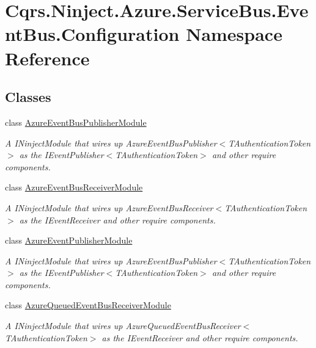 \hypertarget{namespaceCqrs_1_1Ninject_1_1Azure_1_1ServiceBus_1_1EventBus_1_1Configuration}{}\section{Cqrs.\+Ninject.\+Azure.\+Service\+Bus.\+Event\+Bus.\+Configuration Namespace Reference}
\label{namespaceCqrs_1_1Ninject_1_1Azure_1_1ServiceBus_1_1EventBus_1_1Configuration}
\subsection*{Classes}
\begin{DoxyCompactItemize}
\item 
class \hyperlink{classCqrs_1_1Ninject_1_1Azure_1_1ServiceBus_1_1EventBus_1_1Configuration_1_1AzureEventBusPublisherModule}{Azure\+Event\+Bus\+Publisher\+Module}
\begin{DoxyCompactList}\small\item\em A I\+Ninject\+Module that wires up Azure\+Event\+Bus\+Publisher$<$\+T\+Authentication\+Token$>$ as the I\+Event\+Publisher$<$\+T\+Authentication\+Token$>$ and other require components. \end{DoxyCompactList}\item 
class \hyperlink{classCqrs_1_1Ninject_1_1Azure_1_1ServiceBus_1_1EventBus_1_1Configuration_1_1AzureEventBusReceiverModule}{Azure\+Event\+Bus\+Receiver\+Module}
\begin{DoxyCompactList}\small\item\em A I\+Ninject\+Module that wires up Azure\+Event\+Bus\+Receiver$<$\+T\+Authentication\+Token$>$ as the I\+Event\+Receiver and other require components. \end{DoxyCompactList}\item 
class \hyperlink{classCqrs_1_1Ninject_1_1Azure_1_1ServiceBus_1_1EventBus_1_1Configuration_1_1AzureEventPublisherModule}{Azure\+Event\+Publisher\+Module}
\begin{DoxyCompactList}\small\item\em A I\+Ninject\+Module that wires up Azure\+Event\+Bus\+Publisher$<$\+T\+Authentication\+Token$>$ as the I\+Event\+Publisher$<$\+T\+Authentication\+Token$>$ and other require components. \end{DoxyCompactList}\item 
class \hyperlink{classCqrs_1_1Ninject_1_1Azure_1_1ServiceBus_1_1EventBus_1_1Configuration_1_1AzureQueuedEventBusReceiverModule}{Azure\+Queued\+Event\+Bus\+Receiver\+Module}
\begin{DoxyCompactList}\small\item\em A I\+Ninject\+Module that wires up Azure\+Queued\+Event\+Bus\+Receiver$<$\+T\+Authentication\+Token$>$ as the I\+Event\+Receiver and other require components. \end{DoxyCompactList}\end{DoxyCompactItemize}
